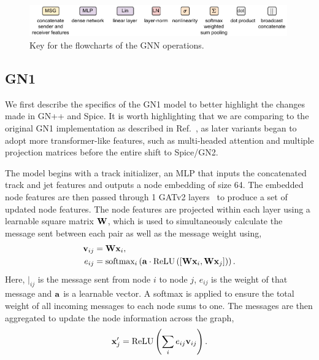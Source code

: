 \begin{figure}[h!]
    \centering
    \includegraphics[width=0.99\textwidth]{figures/flavour_tagging/key.pdf}
    \caption{Key for the flowcharts of the GNN operations.}
    \label{fig:key}
\end{figure}

\subsection{GN1}

We first describe the specifics of the GN1 model to better highlight the changes made in GN++ and Spice.
It is worth highlighting that we are comparing to the original GN1 implementation as described in Ref.~\cite{GN1}, as later variants began to adopt more transformer-like features, such as multi-headed attention and multiple projection matrices before the entire shift to Spice/GN2.

The model begins with a track initializer, an MLP that inputs the concatenated track and jet features and outputs a node embedding of size 64.
The embedded node features are then passed through 1 GATv2 layers~\cite{GATv2} to produce a set of updated node features.
The node features are projected within each layer using a learnable square matrix $\mathbf{W}$, which is used to simultaneously calculate the message sent between each pair as well as the message weight using,
\begin{align}
    \mathbf{v}_{ij} &= \mathbf{W} \mathbf{x}_i, \\
 e_{ij} &= \text{softmax}_i\left(\mathbf{a} \cdot \text{ReLU}\left([\mathbf{W} \mathbf{x}_i, \mathbf{W} \mathbf{x}_j]\right)\right).
\end{align}
Here, $\vert_{ij}$ is the message sent from node $i$ to node $j$,
$e_{ij}$ is the weight of that message and $\mathbf{a}$ is a learnable vector.
A softmax is applied to ensure the total weight of all incoming messages to each node sums to one.
The messages are then aggregated to update the node information across the graph,
\begin{equation}
    \mathbf{x}_j' = \text{ReLU}\left(\sum_{i} e_{ij} \mathbf{v}_{ij}\right).
\end{equation}

